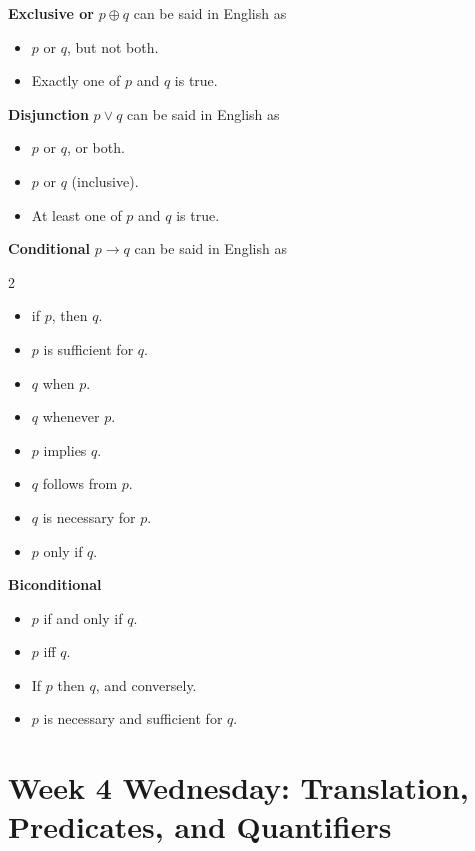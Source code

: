 \documentclass[12pt, oneside]{article}
\begin{document}
{\bf Exclusive or} $p \oplus q$ can be said in English as

\vspace{-20pt}
\begin{itemize}
    \item $p$ or $q$, but not both.
    \item Exactly one of $p$ and $q$ is true.
\end{itemize}

{\bf Disjunction} $p \lor q$ can be said in English as

\vspace{-20pt}
\begin{itemize}
    \item $p$ or $q$, or both.
    \item $p$ or $q$ (inclusive).
    \item At least one of $p$ and $q$ is true.
\end{itemize}

{\bf Conditional} $p \to q$ can be said in English as

\begin{multicols}{2}
\begin{itemize}
    \item if $p$, then $q$.
    \item $p$ is sufficient for $q$.
    \item $q$ when $p$.
    \item $q$ whenever $p$.
    \item $p$ implies $q$.
    \item $q$ follows from $p$.
    \item $q$ is necessary for $p$.
    \item $p$ only if $q$.
\end{itemize}
\end{multicols}

{\bf Biconditional}

\vspace{-20pt}
\begin{itemize}
    \item $p$ if and only if $q$.
    \item $p$ iff $q$.
    \item If $p$ then $q$, and conversely.
    \item $p$ is necessary and sufficient for $q$.
\end{itemize} \newpage


\section*{Week 4 Wednesday: Translation, Predicates, and Quantifiers}
\end{document}
